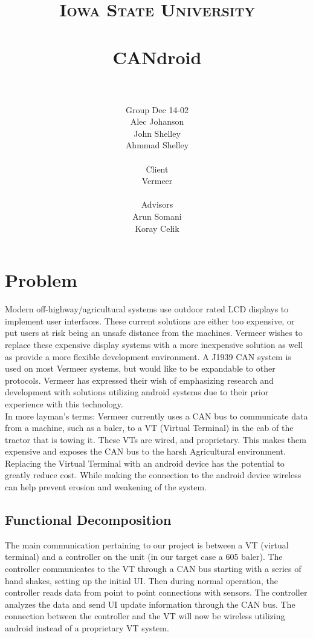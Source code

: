 \documentclass[paper=a4, fontsize=11pt]{scrartcl}
\title{
		\vspace{1in} 	
		\usefont{OT1}{bch}{b}{n}
		\normalfont \normalsize \textsc{Iowa State University} \\ [25pt]
		{\color{darkgreen}\horrule{1pt} \\[0.5cm]}
		\huge CANdroid \\
		{\color{darkgreen}\horrule{1pt} \\[0.5cm]}
		\vspace{1.25in}
}
\author{
		\normalfont 								\normalsize
		{\color{darkgreen} Group Dec 14-02}\\ \normalsize
        Alec Johanson\\[-3pt]		\normalsize
        John Shelley\\[-3pt]		\normalsize
        Ahmmad Shelley\\[-3pt]		\normalsize
		\\ \normalsize
		{\color{darkgreen} Client}\\ \normalsize
		Vermeer \\ \normalsize
		\\ \normalsize
		{\color{darkgreen} Advisors}\\ \normalsize
		Arun Somani \\ \normalsize
		Koray Celik \\ \normalsize
}
\date{}
\numberwithin{equation}{section}		%
\numberwithin{figure}{section}			%
\numberwithin{table}{section}				%
\begin{document}
\maketitle
\pagebreak
\tableofcontents
\pagebreak
\section{Problem}
Modern off-highway/agricultural systems use outdoor rated LCD displays to implement user interfaces. These current solutions are either too expensive, or put users at risk being an unsafe distance from the machines. Vermeer wishes to replace these expensive display systems with a more inexpensive solution as well as provide a more flexible development environment. A J1939 CAN system is used on most Vermeer systems, but would like to be expandable to other protocols. Vermeer has expressed their wish of emphasizing research and development with solutions utilizing android systems due to their prior experience with this technology. \\
	
\noindent In more layman's terms: Vermeer currently uses a CAN bus to communicate data from a machine, such as a baler, to a VT (Virtual Terminal) in the cab of the tractor that is towing it. These VTs are wired, and proprietary. This makes them expensive and exposes the CAN bus to the harsh Agricultural environment. Replacing the Virtual Terminal with an android device has the potential to greatly reduce cost. While making the connection to the android device wireless can help prevent erosion and weakening of the system. \\

\subsection{Functional Decomposition}
The main communication pertaining to our project is between a VT (virtual terminal) and a controller on the unit (in our target case a 605 baler). The controller communicates to the VT through a CAN bus starting with a series of hand shakes, setting up the initial UI. Then during normal operation, the controller reads data from point to point connections with sensors. The controller analyzes the data and send UI update information through the CAN bus. The connection between the controller and the VT will now be wireless utilizing android instead of a proprietary VT system. \\
\end{document}

